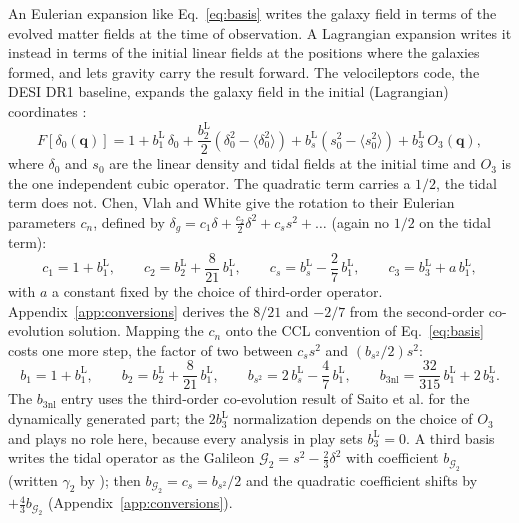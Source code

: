 \documentclass[11pt]{article}
\newcommand{\bone}{b_1}            %
\newcommand{\btwo}{b_2}            %
\newcommand{\bs}{b_{s^2}}          %
\newcommand{\bthree}{b_{3\mathrm{nl}}} %
\newcommand{\boneL}{b_1^{\mathrm{L}}}
\newcommand{\btwoL}{b_2^{\mathrm{L}}}
\newcommand{\bsL}{b_s^{\mathrm{L}}}
\newcommand{\bthreeL}{b_3^{\mathrm{L}}}
\begin{document}
An Eulerian expansion like Eq.~\eqref{eq:basis} writes the galaxy
field in terms of the evolved matter fields at the time of
observation.  A Lagrangian expansion writes it instead in terms of the
initial linear fields at the positions where the galaxies formed, and
lets gravity carry the result forward.  The velocileptors code, the
DESI DR1 baseline, expands the galaxy
field in the initial (Lagrangian) coordinates
\cite{ChenVlahWhite2020,Maus2024}:
\begin{equation}
F[\delta_0(\mathbf{q})] = 1 + \boneL\,\delta_0
 + \frac{\btwoL}{2}\left(\delta_0^2 - \langle\delta_0^2\rangle\right)
 + \bsL\left(s_0^2 - \langle s_0^2\rangle\right)
 + \bthreeL\,O_3(\mathbf{q}) ,
\label{eq:lagbasis}
\end{equation}
where $\delta_0$ and $s_0$ are the linear density and tidal fields at
the initial time and $O_3$ is the one independent cubic operator.  The
quadratic term carries a $1/2$, the tidal term does not.  Chen, Vlah
and White \cite{ChenVlahWhite2020} give the rotation to their Eulerian
parameters $c_n$, defined by
$\delta_g = c_1\delta + \tfrac{c_2}{2}\delta^2 + c_s s^2 + \ldots$
(again no $1/2$ on the tidal term):
\begin{equation}
c_1 = 1 + \boneL , \qquad
c_2 = \btwoL + \frac{8}{21}\,\boneL , \qquad
c_s = \bsL - \frac{2}{7}\,\boneL , \qquad
c_3 = \bthreeL + a\,\boneL ,
\label{eq:rotation}
\end{equation}
with $a$ a constant fixed by the choice of third-order operator.
Appendix~\ref{app:conversions} derives the $8/21$ and $-2/7$ from the
second-order co-evolution solution.  Mapping the $c_n$ onto the CCL
convention of Eq.~\eqref{eq:basis} costs one more step, the factor of
two between $c_s s^2$ and $(\bs/2)s^2$:
\begin{equation}
\boxed{\;
\bone = 1 + \boneL , \qquad
\btwo = \btwoL + \frac{8}{21}\,\boneL , \qquad
\bs = 2\,\bsL - \frac{4}{7}\,\boneL , \qquad
\bthree = \frac{32}{315}\,\boneL + 2\,\bthreeL .
\;}
\label{eq:full-conversion}
\end{equation}
The $\bthree$ entry uses the third-order co-evolution result of Saito
et al. \cite{Saito2014} for the dynamically generated part; the
$2\bthreeL$ normalization depends on the choice of $O_3$ and plays no
role here, because every analysis in play sets $\bthreeL = 0$.  A
third basis writes the tidal operator as the Galileon
$\mathcal{G}_2 = s^2 - \tfrac{2}{3}\delta^2$ with coefficient
$b_{\mathcal{G}_2}$ (written $\gamma_2$ by \cite{Semenaite2025}); then
$b_{\mathcal{G}_2} = c_s = \bs/2$ and the quadratic coefficient shifts
by $+\tfrac{4}{3}b_{\mathcal{G}_2}$ (Appendix~\ref{app:conversions}).
\end{document}

